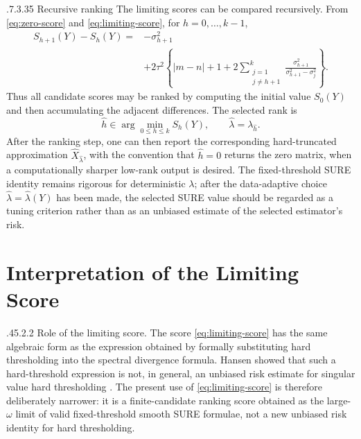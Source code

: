 \documentclass[12pt,reqno]{amsart}
\makeatletter
\numberwithin{equation}{section}
\def\subsection{\@startsection{subsection}{2}{\z@}%
  {.7\linespacing\@plus.3\linespacing}{.35\linespacing}%
  {\normalfont\bfseries\def\@secnumfont{\bfseries}}}
\def\paragraph{\@startsection{paragraph}{4}{\z@}%
  {.45\linespacing\@plus.2\linespacing}{.2\linespacing}%
  {\normalfont\bfseries}}
\theoremstyle{plain}
\theoremstyle{definition}
\makeatother
\begin{document}
\subsection{Recursive ranking}
The limiting scores can be compared recursively. From \eqref{eq:zero-score} and \eqref{eq:limiting-score}, for $h=0,
\ldots,k-1$,
\begin{equation}\label{eq:increment}
\begin{aligned}
    S_{h+1}(Y)-S_h(Y)
    ={}&-\sigma_{h+1}^{2} \\
    &+2\tau^2\left\{|m-n|+1
    +2\sum_{\substack{j=1\\j\neq h+1}}^{k}
    \frac{\sigma_{h+1}^{2}}{\sigma_{h+1}^{2}-\sigma_j^{2}}
    \right\}.
\end{aligned}
\end{equation}
Thus all candidate scores may be ranked by computing the initial value $S_0(Y)$ and then accumulating the adjacent differences. The selected rank is
\begin{equation}
    \widehat h\in\arg\min_{0\leq h\leq k} S_h(Y),
    \qquad
    \widehat\lambda=\lambda_{\widehat h}.
\end{equation}
After the ranking step, one can then report the corresponding hard-truncated approximation $\widehat X_{\widehat\lambda}$, with the convention that $\widehat h=0$ returns the zero matrix, when a computationally sharper low-rank output is desired. The fixed-threshold SURE identity remains rigorous for deterministic $\lambda$; after the data-adaptive choice $\widehat\lambda=\widehat\lambda(Y)$ has been made, the selected SURE value should be regarded as a tuning criterion rather than as an unbiased estimate of the selected estimator's risk.

\section{Interpretation of the Limiting Score}

\paragraph{Role of the limiting score.}
The score \eqref{eq:limiting-score} has the same algebraic form as the expression obtained by formally substituting hard thresholding into the spectral divergence formula. Hansen showed that such a hard-threshold expression is not, in general, an unbiased risk estimate for singular value hard thresholding \cite{hansen2017comment}. The present use of \eqref{eq:limiting-score} is therefore deliberately narrower: it is a finite-candidate ranking score obtained as the large-$\omega$ limit of valid fixed-threshold smooth SURE formulae, not a new unbiased risk identity for hard thresholding.
\end{document}
